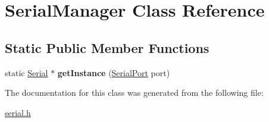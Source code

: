 \hypertarget{classSerialManager}{}\section{Serial\+Manager Class Reference}
\label{classSerialManager}
\subsection*{Static Public Member Functions}
\begin{DoxyCompactItemize}
\item 
\mbox{\label{classSerialManager_a6b9c81d22a14b2c3a072a4c2120e5ae7}} 
static \hyperlink{classSerial}{Serial} $\ast$ {\bfseries get\+Instance} (\hyperlink{serial_8h_a3f17dbb19b0b0ea39447b731f23a33f5}{Serial\+Port} port)
\end{DoxyCompactItemize}


The documentation for this class was generated from the following file\+:\begin{DoxyCompactItemize}
\item 
\hyperlink{serial_8h}{serial.\+h}\end{DoxyCompactItemize}
